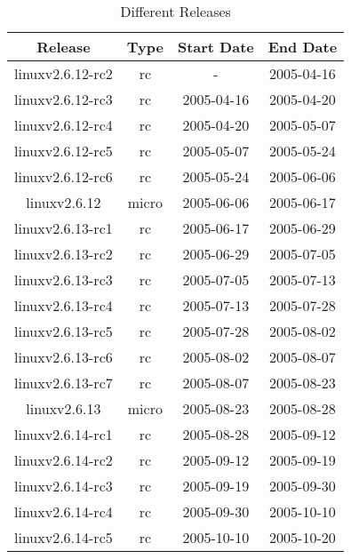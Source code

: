 \documentclass{acm_proc_article-sp}
\begin{document}
\begin{table}[ht]
\caption{Different Releases}  %
\centering 						%
\begin{tabular}{c c c c}				%
\hline\hline						%
Release & Type & Start Date & End Date \\ [0.5ex]
\hline 							%
linuxv2.6.12-rc2 & rc       & - & 2005-04-16 \\
linuxv2.6.12-rc3 & rc       & 2005-04-16 & 2005-04-20 \\
linuxv2.6.12-rc4 & rc       & 2005-04-20 & 2005-05-07 \\
linuxv2.6.12-rc5 & rc       & 2005-05-07 & 2005-05-24 \\
linuxv2.6.12-rc6 & rc       & 2005-05-24 & 2005-06-06 \\
linuxv2.6.12        & micro & 2005-06-06 & 2005-06-17 \\
linuxv2.6.13-rc1 & rc       & 2005-06-17 & 2005-06-29 \\
linuxv2.6.13-rc2 & rc       & 2005-06-29 & 2005-07-05 \\
linuxv2.6.13-rc3 & rc       & 2005-07-05 & 2005-07-13 \\
linuxv2.6.13-rc4 & rc       & 2005-07-13 & 2005-07-28 \\
linuxv2.6.13-rc5 & rc       & 2005-07-28 & 2005-08-02 \\
linuxv2.6.13-rc6 & rc       & 2005-08-02 & 2005-08-07 \\
linuxv2.6.13-rc7 & rc       & 2005-08-07 & 2005-08-23 \\
linuxv2.6.13        & micro & 2005-08-23 & 2005-08-28 \\
linuxv2.6.14-rc1 & rc       & 2005-08-28 & 2005-09-12 \\
linuxv2.6.14-rc2 & rc       & 2005-09-12 & 2005-09-19 \\
linuxv2.6.14-rc3 & rc       & 2005-09-19 & 2005-09-30 \\
linuxv2.6.14-rc4 & rc       & 2005-09-30 & 2005-10-10 \\
linuxv2.6.14-rc5 & rc       & 2005-10-10 & 2005-10-20 \\
[1ex]							%
\hline 							%
\end{tabular}
\label{table:nonlin} 				%
\end{table}
\end{document}
